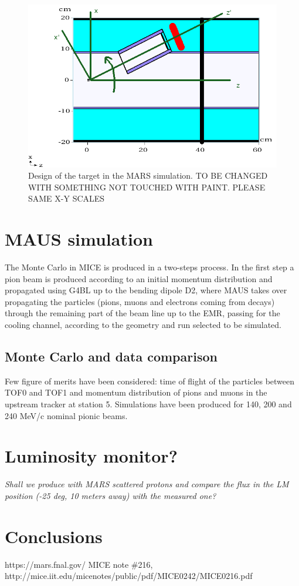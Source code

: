 \documentclass[a4paper,11pt]{article}
\begin{document}
\begin{figure}
  \begin{center}
    \includegraphics[width=1.0\columnwidth]{./figures/MARS1.png}
    \caption{Design of the target in the MARS simulation. TO BE CHANGED WITH SOMETHING NOT TOUCHED WITH PAINT. PLEASE SAME X-Y SCALES}
    \label{fig:MARS1}
  \end{center}
\end{figure}

\section{MAUS simulation}

The Monte Carlo in MICE is produced in a two-steps process. In the first step a pion beam is produced according to an initial momentum distribution and propagated using G4BL up to the bending dipole D2, where MAUS takes over propagating the particles (pions, muons and electrons coming from decays) through the remaining part of the beam line up to the EMR, passing for the cooling channel, according to the geometry and run selected to be simulated.

\subsection{Monte Carlo and data comparison}

Few figure of merits have been considered: time of flight of the particles between TOF0 and TOF1 and momentum distribution of pions and muons in the upstream tracker at station 5.
Simulations have been produced for 140, 200 and 240 MeV/c nominal pionic beams.

\section{Luminosity monitor?}
\textit{Shall we produce with MARS scattered protons and compare the flux in the LM position (-25 deg, 10 meters away) with the measured one?} 

\section{Conclusions}

\begin{thebibliography}{9}
 https://mars.fnal.gov/
 MICE note \#216, http://mice.iit.edu/micenotes/public/pdf/MICE0242/MICE0216.pdf
\end{thebibliography}
\end{document}
